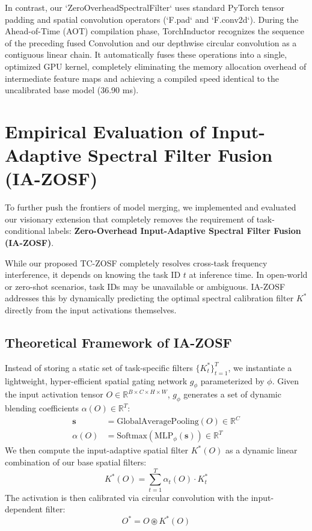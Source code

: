 \documentclass{article}
\theoremstyle{plain}
\theoremstyle{definition}
\theoremstyle{remark}
\begin{document}
In contrast, our `ZeroOverheadSpectralFilter` uses standard PyTorch tensor padding and spatial convolution operators (`F.pad` and `F.conv2d`). During the Ahead-of-Time (AOT) compilation phase, TorchInductor recognizes the sequence of the preceding fused Convolution and our depthwise circular convolution as a contiguous linear chain. It automatically fuses these operations into a single, optimized GPU kernel, completely eliminating the memory allocation overhead of intermediate feature maps and achieving a compiled speed identical to the uncalibrated base model (36.90 ms).

\section{Empirical Evaluation of Input-Adaptive Spectral Filter Fusion (IA-ZOSF)}
\label{app:iazosf}
To further push the frontiers of model merging, we implemented and evaluated our visionary extension that completely removes the requirement of task-conditional labels: \textbf{Zero-Overhead Input-Adaptive Spectral Filter Fusion (IA-ZOSF)}.

While our proposed TC-ZOSF completely resolves cross-task frequency interference, it depends on knowing the task ID $t$ at inference time. In open-world or zero-shot scenarios, task IDs may be unavailable or ambiguous. IA-ZOSF addresses this by dynamically predicting the optimal spectral calibration filter $K^*$ directly from the input activations themselves.

\subsection{Theoretical Framework of IA-ZOSF}
Instead of storing a static set of task-specific filters $\{K^*_t\}_{t=1}^T$, we instantiate a lightweight, hyper-efficient spatial gating network $g_\phi$ parameterized by $\phi$. Given the input activation tensor $O \in \mathbb{R}^{B \times C \times H \times W}$, $g_\phi$ generates a set of dynamic blending coefficients $\alpha(O) \in \mathbb{R}^T$:
\begin{align}
    \mathbf{s} &= \text{GlobalAveragePooling}(O) \in \mathbb{R}^C \\
    \alpha(O) &= \text{Softmax}(\text{MLP}_\phi(\mathbf{s})) \in \mathbb{R}^T
\end{align}
We then compute the input-adaptive spatial filter $K^*(O)$ as a dynamic linear combination of our base spatial filters:
\begin{equation}
    K^*(O) = \sum_{t=1}^T \alpha_t(O) \cdot K^*_t
\end{equation}
The activation is then calibrated via circular convolution with the input-dependent filter:
\begin{equation}
    O^* = O \circledast K^*(O)
\end{equation}
\end{document}
